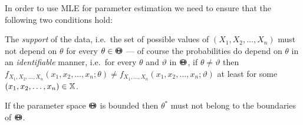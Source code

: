 \begin{rem}
In order to use MLE for parameter estimation we need to ensure that the following two conditions hold:
\be
\item The {\em support} of the data, i.e.~the set of possible values of $(X_1,X_2,\ldots,X_n)$ must not depend on $\theta$ for every $\theta \in {\Theta}\mspace{-11 mu}{\Theta}$ --- of course the probabilities do depend on $\theta$ in an {\em identifiable} manner, i.e.~for every $\theta$ and $\vartheta$ in ${\Theta}\mspace{-11 mu}{\Theta}$, if $\theta \neq \vartheta$ then $f_{X_1,X_2,\ldots,X_n}(x_1,x_2,\ldots,x_n;\theta) \neq f_{X_1,\ldots,X_n}(x_1,x_2,\ldots,x_n;\vartheta)$ at least for some $(x_1,x_2,\ldots,x_n) \in \mathbb{X}$.
\item If the parameter space ${\Theta}\mspace{-11 mu}{\Theta}$ is bounded then $\theta^*$ must not belong to the boundaries of ${\Theta}\mspace{-11 mu}{\Theta}$.
\ee
\end{rem}

